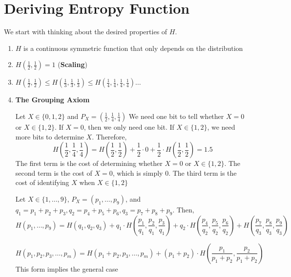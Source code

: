 \section{Deriving Entropy Function}
We start with thinking about the desired properties of $H$.
\begin{enumerate}
    \item $H$ is a continuous symmetric function that only depends on the distribution
    \item $H(\frac{1}{2}, \frac{1}{2}) = 1$ (\textbf{Scaling})
    \item $H(\frac{1}{2}, \frac{1}{2}) \le H(\frac{1}{3}, \frac{1}{3}, \frac{1}{3}) \le H(\frac{1}{4}, \frac{1}{4}, \frac{1}{4}, \frac{1}{4}) \ldots$
    \item \textbf{The Grouping Axiom}
    \begin{eg}
        Let $X \in \{ 0, 1, 2 \}$ and $P_X = (\frac{1}{2}, \frac{1}{4}, \frac{1}{4})$
        We need one bit to tell whether $X = 0$ or $X \in \{ 1, 2 \}$. If $X = 0$, then we only need one bit. If $X \in \{ 1, 2 \}$, we need more bits to determine $X$. Therefore, 
        \[
            H(\frac{1}{2}, \frac{1}{4}, \frac{1}{4}) = H(\frac{1}{2}, \frac{1}{2}) + \frac{1}{2} \cdot 0 + \frac{1}{2} \cdot H(\frac{1}{2}, \frac{1}{2}) = 1.5
        \]
        The first term is the cost of determining whether $X = 0$ or $X \in \{ 1, 2 \}$. The second term is the cost of $X = 0$, which is simply 0. The third term is the cost of identifying $X$ when $X \in \{ 1, 2 \}$
    \end{eg}
    \begin{eg}
        Let $X \in \{ 1, \ldots, 9 \}$, $P_X = (p_1, \ldots, p_9)$, and $q_1 = p_1 + p_2 + p_3, q_2 = p_4 + p_5 + p_6, q_3 = p_7 + p_8 + p_9$. Then,
        \[
            H(p_1, \ldots, p_9) = H(q_1, q_2, q_3) + q_1 \cdot H(\frac{p_1}{q_1}, \frac{p_2}{q_1}, \frac{p_3}{q_1}) + q_2 \cdot H(\frac{p_4}{q_2}, \frac{p_5}{q_2}, \frac{p_6}{q_2}) + H(\frac{p_7}{q_3}, \frac{p_8}{q_3}, \frac{p_9}{q_3})
        \]
    \end{eg}
    \begin{eg}
        \[
            H(p_1, p_2, p_3, \ldots, p_m) = H(p_1 + p_2, p_3, \ldots, p_m) + (p_1 + p_2) \cdot H(\frac{p_1}{p_1 + p_2}, \frac{p_2}{p_1 + p_2})
        \]
        This form implies the general case
    \end{eg}
\end{enumerate}

